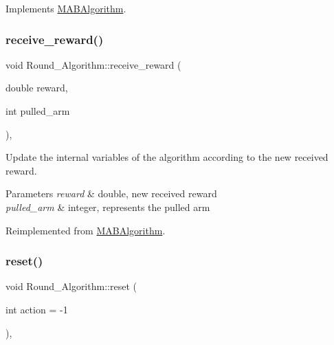 Implements \mbox{\hyperlink{class_m_a_b_algorithm_afb48f01df0e1860d19759f6e20335007}{M\+A\+B\+Algorithm}}.

\mbox{\label{class_round___algorithm_a945da188a51c00d1923f4eb8434042eb}} 
\subsubsection{\texorpdfstring{receive\+\_\+reward()}{receive\_reward()}}
{\footnotesize\ttfamily void Round\+\_\+\+Algorithm\+::receive\+\_\+reward (\begin{DoxyParamCaption}\item[{double}]{reward,  }\item[{int}]{pulled\+\_\+arm }\end{DoxyParamCaption})\hspace{0.3cm}{\ttfamily [override]}, {\ttfamily [virtual]}}



Update the internal variables of the algorithm according to the new received reward. 


\begin{DoxyParams}{Parameters}
{\em reward} & double, new received reward \\
\hline
{\em pulled\+\_\+arm} & integer, represents the pulled arm \\
\hline
\end{DoxyParams}


Reimplemented from \mbox{\hyperlink{class_m_a_b_algorithm_aa584b3d6b86fa050e3389be9781b5782}{M\+A\+B\+Algorithm}}.

\mbox{\label{class_round___algorithm_ae2c21984dbd89f5ba1a4f530472cf7f7}} 
\subsubsection{\texorpdfstring{reset()}{reset()}}
{\footnotesize\ttfamily void Round\+\_\+\+Algorithm\+::reset (\begin{DoxyParamCaption}\item[{int}]{action = {\ttfamily -\/1} }\end{DoxyParamCaption})\hspace{0.3cm}{\ttfamily [override]}, {\ttfamily [virtual]}}



